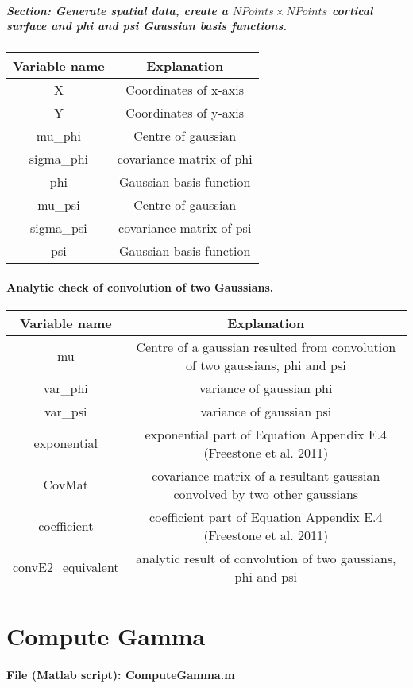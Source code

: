 \documentclass[a4paper, 12pt, english]{article}
\begin{document}
\subparagraph{Section: Generate spatial data, create a $NPoints\times NPoints$ cortical surface and phi and psi Gaussian basis functions.\\}


\begin{tabular}{|c|c|}
\hline
Variable name & Explanation\tabularnewline
\hline
X & Coordinates of x-axis\tabularnewline
\hline
Y & Coordinates of y-axis\tabularnewline
\hline
mu\_phi & Centre of gaussian\tabularnewline
\hline
sigma\_phi & covariance matrix of phi\tabularnewline
\hline
phi & Gaussian basis function\tabularnewline
\hline
mu\_psi & Centre of gaussian\tabularnewline
\hline
sigma\_psi & covariance matrix of psi\tabularnewline
\hline
psi & Gaussian basis function\tabularnewline
\hline
\end{tabular}

\paragraph{Analytic check of convolution of two Gaussians.\\}
\label{subp:Analytic check of convolution of two Gaussians}


\begin{tabular}{|c|c|}
\hline
Variable name & Explanation\tabularnewline
\hline
mu & Centre of a gaussian resulted from convolution of two gaussians, phi
and psi\tabularnewline
\hline
var\_phi & variance of gaussian phi\tabularnewline
\hline
var\_psi & variance of gaussian psi\tabularnewline
\hline
exponential & exponential part of Equation Appendix E.4 (Freestone et al. 2011)\tabularnewline
\hline
CovMat & covariance matrix of a resultant gaussian convolved by two other gaussians\tabularnewline
\hline
coefficient & coefficient part of Equation Appendix E.4 (Freestone et al. 2011)\tabularnewline
\hline
convE2\_equivalent & analytic result of convolution of two gaussians, phi and psi\tabularnewline
\hline
\end{tabular}

\newpage




\section{Compute Gamma}

\paragraph{File (Matlab script): ComputeGamma.m}
\end{document}
